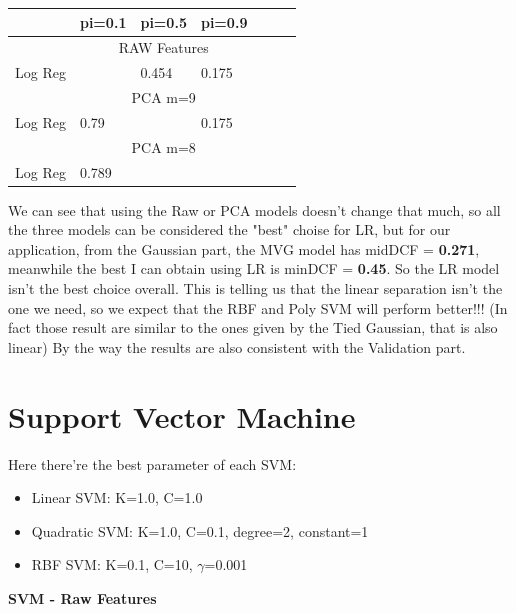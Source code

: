\documentclass[english]{report}
\begin{document}
\begin{table}[H]
    \centering
    \begin{tabular}{lllllll}
        \toprule
               & pi=0.1 & pi=0.5 & pi=0.9 \\ \midrule
                                & \multicolumn{3}{c}{RAW Features}  \\
    Log Reg    & \color{red}{0.789}      & 0.454      & 0.175  \\ \midrule
                                & \multicolumn{3}{c}{PCA m=9}  \\
    Log Reg    & 0.79     & \color{red}{ 0.45}       & 0.175 \\ \midrule
                                & \multicolumn{3}{c}{PCA m=8}  \\
    Log Reg    & 0.789      & \color{red}{ 0.45}      & \color{red}{0.174} \\
    \bottomrule
    \end{tabular}
    \label{tab:LinearLogReg_valid_eval}
\end{table}
We can see that using the Raw or PCA models doesn't change that much, so all the three models can be considered the "best" choise 
for LR, but for our application, from the Gaussian part, the MVG model has midDCF = \textbf{0.271}, meanwhile the best 
I can obtain using LR is minDCF = \textbf{0.45}. So the LR model isn't the best choice overall. This is telling us that the linear
separation isn't the one we need, so we expect that the RBF and Poly SVM will perform better!!! (In fact those result are similar
to the ones given by the Tied Gaussian, that is also linear)
By the way the results are also consistent with the Validation part.

\newpage

\section{Support Vector Machine}
Here there're the best parameter of each SVM:
\begin{itemize}
    \item Linear SVM: K=1.0, C=1.0
    \item Quadratic SVM: K=1.0, C=0.1, degree=2, constant=1
    \item RBF SVM: K=0.1, C=10, $\gamma$=0.001
\end{itemize}

\textbf{SVM - Raw Features}
\end{document}
